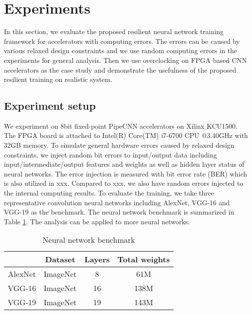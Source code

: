 \section{Experiments} \label{sec:casestudy}
In this section, we evaluate the proposed resilient neural network training 
framework for accelerators with computing errors. The errors can be caused by 
various relaxed design constraints and we use random computing errors in 
the experiments for general analysis. Then we use overclocking on FPGA based 
CNN accelerators as the case study and demonstrate the usefulness of the 
proposed resilient training on realistic system.

\subsection{Experiment setup}
We experiment on 8bit fixed-point PipeCNN \cite{pipecnn_2} accelerators on Xilinx KCU1500.
The FPGA board is attached to Intel(R) Core(TM) i7-6700 CPU @3.40GHz with 32GB memory.
To simulate general hardware errors caused by relaxed design constraints, we 
inject random bit errors to input/output data including 
input/intermediate/output features and weights as well as 
hidden layer status of neural networks. The error injection is measured with 
bit error rate (BER) which is also utilized in xxx. Compared to xxx,
we also have random errors injected to the internal computing results. 
To evaluate the training, we take three representative convolution 
neural networks including AlexNet, VGG-16 and VGG-19 as the benchmark. 
The neural network benchmark is summarized in Table \ref{tab:CNN-table}. 
The analysis can be applied to more neural networks.

\begin{table}[h]
        \centering
        \vspace{-0.3em}
        \caption{Neural network benchmark}
        \label{tab:CNN-table}
        \vspace{-0.3em}
        \begin{tabular}{c|c|c|c}
		\toprule
		  & Dataset & Layers & Total weights \\
		\midrule
		AlexNet & ImageNet & 8 & 61M \\
		\midrule
		VGG-16 & ImageNet & 16 & 138M \\
		\midrule
		VGG-19 & ImageNet & 19 & 143M \\
		\bottomrule
        \end{tabular}
        \vspace{-1em}
\end{table}

